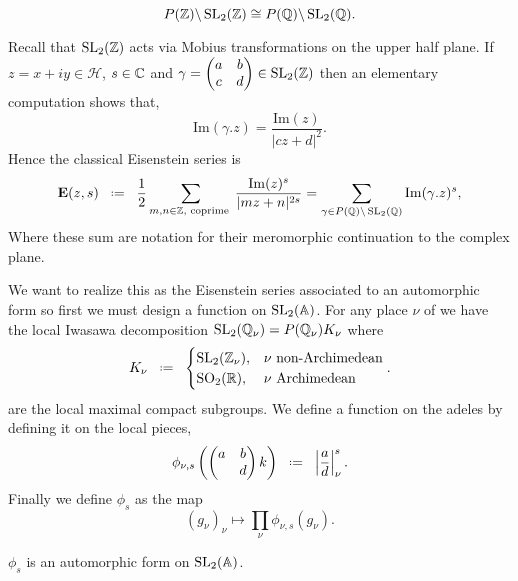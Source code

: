 \begin{Lemma}
	\[P(\Z) \backslash \SL_2(\Z) \cong P(\Q) \backslash \SL_2(\Q). \]
\end{Lemma}
Recall that \(\SL_2(\Z)\) acts via Mobius transformations on the upper half plane. If \(z= x+ iy \in \mathcal{H}\), \(s\in \C\) and \(\gamma = \begin{pmatrix}
	a & b\\ c& d \end{pmatrix}\in \SL_2(\Z)\) then an elementary computation shows that,
\[\mathrm{Im}(\gamma.z) = \frac{\mathrm{Im}(z)}{|cz + d|^{2}}.\]
Hence the classical Eisenstein series is
\[\mathbf{E}(z, s) \defeq \frac{1}{2} \sum_{m,n\in \Z, \text{ coprime }} \frac{\mathrm{Im}(z)^{s}}{|mz+n|^{2s}} = \sum_{\gamma\in P(\Q)\backslash \SL_2(\Q)} \mathrm{Im}(\gamma.z)^{s},\]
Where these sum are notation for their meromorphic continuation to the complex plane. 

We want to realize this as the Eisenstein series associated to an automorphic form so first we must design a function on \(\SL_2(\A)\). For any place \(\nu\) of \Q we have the local Iwasawa decomposition \(\SL_2(\Q_\nu) = P(\Q_\nu) K_\nu\) where 
\[K_\nu \defeq \begin{cases}
	\SL_2(\Z_\nu), & \nu \text{ non-Archimedean}\\
	\SO_2(\R), & \nu \text{ Archimedean}
\end{cases}.\]
 are the local maximal compact subgroups. We define a function on the adeles by defining it on the local pieces,
 \[\phi_{\nu, s}\left(\begin{pmatrix}
 	a & b\\ & d
 \end{pmatrix}k\right) \defeq \left| \frac{a}{d} \right|_\nu^s .\]
 Finally we define \(\phi_s\) as the map 
 \[(g_\nu)_{\nu} \mapsto \prod_\nu \phi_{\nu,s}(g_\nu).\]
 
 \begin{Lemma}
 	\(\phi_s\) is an automorphic form on \(\SL_2(\A)\).
 \end{Lemma}
 
